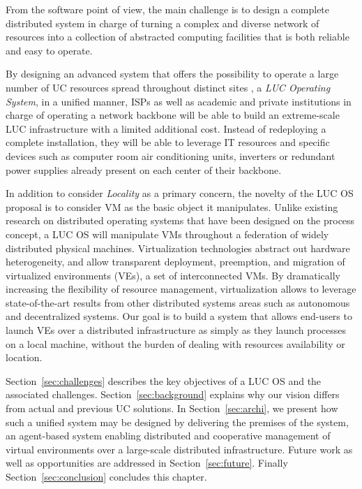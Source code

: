 From the software point of view, the main challenge is to design a complete distributed
system in charge of turning a complex and diverse network of resources into a collection
of abstracted computing facilities that is both reliable and easy to operate.

\begin{svgraybox}
By designing an advanced system that offers the possibility to operate a large
number of UC resources spread throughout distinct sites \ie, a \emph{LUC
  Operating System}, in a unified manner,
ISPs as well as academic and private institutions in
charge of operating a network backbone will be able to build an extreme-scale
LUC infrastructure with a limited additional cost. Instead of redeploying a
complete installation, they will be able to leverage IT resources and
specific devices such as computer room air conditioning units, inverters or
redundant power supplies already present on each center of their
backbone. 
\end{svgraybox}


\medskip

In addition to consider \emph{Locality} as a primary concern, the novelty of the LUC OS
proposal is to consider VM as the basic object it manipulates.  Unlike existing
research on distributed operating systems that have been designed on the process concept, a LUC OS will manipulate VMs throughout a federation of widely distributed
physical machines. Virtualization technologies abstract out hardware heterogeneity, and allow
transparent deployment, preemption, and migration of virtualized
environments (VEs), \ie a set of interconnected VMs.
By dramatically increasing the flexibility of resource management, virtualization 
allows to leverage state-of-the-art results from other distributed
systems areas such as autonomous and decentralized systems.  
Our goal is to build a system that allows end-users to launch VEs over a
distributed infrastructure as simply as they launch processes on a
local machine, \ie  without the burden of dealing with resources
availability or location.

Section~\ref{sec:challenges} describes the key objectives of a LUC OS and the associated challenges. 
Section~\ref{sec:background} explains why our vision differs from actual and previous UC solutions. In
Section~\ref{sec:archi}, we present how such a unified system may be designed
by delivering the premises of the \discovery system, an agent-based system
enabling distributed and cooperative management of virtual environments over a
large-scale distributed infrastructure.
Future work as well as opportunities  are addressed in Section~\ref{sec:future}. Finally Section~\ref{sec:conclusion} concludes this chapter. 
